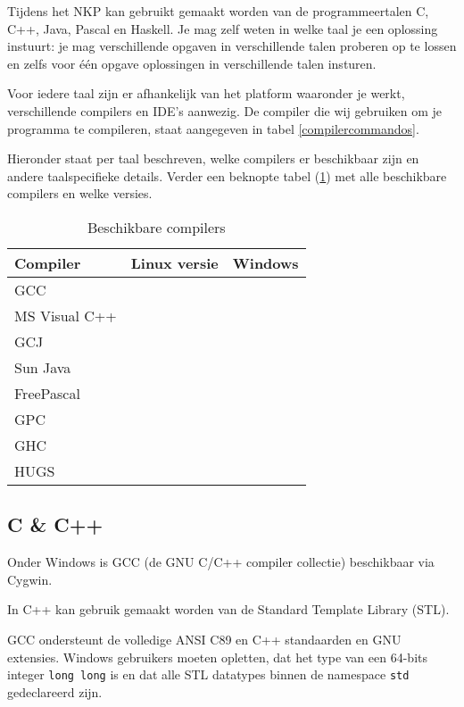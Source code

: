 \documentclass[11pt,titlepage,a4paper]{article}
\begin{document}
Tijdens het NKP kan gebruikt gemaakt worden van de programmeertalen C,
C++, Java, Pascal en Haskell. Je mag zelf weten in welke taal je een
oplossing instuurt: je mag verschillende opgaven in verschillende
talen proberen op te lossen en zelfs voor \'e\'en opgave oplossingen
in verschillende talen insturen.

Voor iedere taal zijn er afhankelijk van het platform waaronder je
werkt, verschillende compilers en IDE's aanwezig. De compiler die wij
gebruiken om je programma te compileren, staat aangegeven in tabel
\ref{compilercommandos}.

Hieronder staat per taal beschreven, welke compilers er
beschikbaar zijn en andere taalspecifieke details. Verder een beknopte
tabel (\ref{compilers}) met alle beschikbare compilers en welke versies.

\begin{table}[!ht]
\begin{center}
\caption{Beschikbare compilers}
\begin{tabular}{|l|c|c|}
\hline
Compiler & Linux versie & Windows \\
\hline
GCC				& \LINUXGCC		& \WINDOWSGCC \\
MS Visual C++	&				& \WINDOWSMSC \\
GCJ				& \LINUXGCJ		& \WINDOWSGCJ \\
Sun Java		& \LINUXJAVA	& \WINDOWSJAVA \\
FreePascal		& \LINUXFPC		& \WINDOWSFPC \\
GPC				& \LINUXGPC		& \WINDOWSGPC \\
GHC				& \LINUXGHC		& \WINDOWSGHC \\
HUGS			& \LINUXHUGS	& \WINDOWSHUGS \\
\hline
\end{tabular}
\label{compilers}
\end{center}
\end{table}


\subsection{C \& C++}

Onder Windows is GCC (de GNU C/C++ compiler collectie) beschikbaar
via Cygwin.

In C++ kan gebruik gemaakt worden van de Standard Template Library
(STL).

GCC ondersteunt de volledige ANSI C89 en C++ standaarden en GNU
extensies. Windows gebruikers moeten opletten, dat het type van een
64-bits integer \texttt{long long} is en dat alle STL datatypes binnen de
namespace \texttt{std} gedeclareerd zijn.
\end{document}
